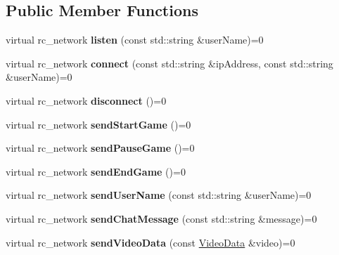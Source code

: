 \subsection*{Public Member Functions}
\begin{DoxyCompactItemize}
\item 
\hypertarget{classNetwork_afb5306e2b769c01780aaa44d2c14306d}{
virtual rc\_\-network {\bfseries listen} (const std::string \&userName)=0}
\label{classNetwork_afb5306e2b769c01780aaa44d2c14306d}

\item 
\hypertarget{classNetwork_a105f5e229e0ac9ff2b718dd34112c292}{
virtual rc\_\-network {\bfseries connect} (const std::string \&ipAddress, const std::string \&userName)=0}
\label{classNetwork_a105f5e229e0ac9ff2b718dd34112c292}

\item 
\hypertarget{classNetwork_a1b0e29fc9936615e76c1db95caba0a9e}{
virtual rc\_\-network {\bfseries disconnect} ()=0}
\label{classNetwork_a1b0e29fc9936615e76c1db95caba0a9e}

\item 
\hypertarget{classNetwork_a3f6b451fd546f2e44eb2c14661bc1ad3}{
virtual rc\_\-network {\bfseries sendStartGame} ()=0}
\label{classNetwork_a3f6b451fd546f2e44eb2c14661bc1ad3}

\item 
\hypertarget{classNetwork_ac60291a8d99468ebc38d085fc0455df0}{
virtual rc\_\-network {\bfseries sendPauseGame} ()=0}
\label{classNetwork_ac60291a8d99468ebc38d085fc0455df0}

\item 
\hypertarget{classNetwork_ae3f72f3003309c6d38105f504db8ce05}{
virtual rc\_\-network {\bfseries sendEndGame} ()=0}
\label{classNetwork_ae3f72f3003309c6d38105f504db8ce05}

\item 
\hypertarget{classNetwork_a741e75b2e9adfc188c53e150b4dd4610}{
virtual rc\_\-network {\bfseries sendUserName} (const std::string \&userName)=0}
\label{classNetwork_a741e75b2e9adfc188c53e150b4dd4610}

\item 
\hypertarget{classNetwork_aa5e1e44e3cb4862b2c343999c89ce3b5}{
virtual rc\_\-network {\bfseries sendChatMessage} (const std::string \&message)=0}
\label{classNetwork_aa5e1e44e3cb4862b2c343999c89ce3b5}

\item 
\hypertarget{classNetwork_a189df8819d21d4f1a277ca753453045b}{
virtual rc\_\-network {\bfseries sendVideoData} (const \hyperlink{structVideoData}{VideoData} \&video)=0}
\label{classNetwork_a189df8819d21d4f1a277ca753453045b}


\end{DoxyCompactItemize}
